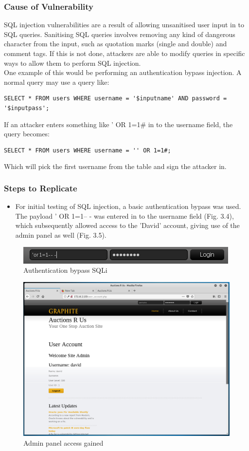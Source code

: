 \documentclass{report}
\begin{document}
\subsubsection{Cause of Vulnerability}
SQL injection vulnerabilities are a result of allowing unsanitised user input in to SQL queries. Sanitising SQL queries involves removing any kind of dangerous character from the input, such as quotation marks (single and double) and comment tags. If this is not done, attackers are able to modify queries in specific ways to allow them to perform SQL injection.\\
One example of this would be performing an authentication bypass injection. A normal query may use a query like:
\begin{verbatim}
SELECT * FROM users WHERE username = '$inputname' AND password = 
'$inputpass';
\end{verbatim}
If an attacker enters something like ' OR 1=1\# in to the username field, the query becomes:
\begin{verbatim}
SELECT * FROM users WHERE username = '' OR 1=1#;
\end{verbatim}
Which will pick the first username from the table and sign the attacker in.
\subsubsection{Steps to Replicate}
\begin{itemize}
	\item For initial testing of SQL injection, a basic authentication bypass was used. The payload ' OR 1=1-- - was entered in to the username field (Fig. 3.4), which subsequently allowed access to the 'David' account, giving use of the admin panel as well (Fig. 3.5).
\end{itemize}
\pagebreak
\begin{figure}
	\centering
	\includegraphics[scale=1]{img/sqli1.png}
	\caption{Authentication bypass SQLi}
\end{figure}
\begin{figure}
	\centering
	\includegraphics[scale=0.4]{img/sqli2.png}
	\caption{Admin panel access gained}
\end{figure}
\end{document}
